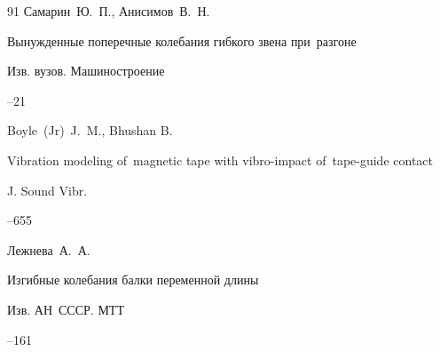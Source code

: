 \begin{thebibliography}{91}
\by Самарин~Ю.~П., Анисимов~В.~Н.

\paper Вынужденные поперечные колебания гибкого звена при~разгоне

\jour Изв. вузов. Машиностроение



--21











\by Boyle~(Jr)~J.~M., Bhushan B.

\paper Vibration modeling of~magnetic tape with vibro-impact of~tape-guide contact

\jour J. Sound Vibr.




--655













\by Лежнева~А.~А.

\paper Изгибные колебания балки переменной длины

\jour Изв. АН~СССР. МТТ



--161








\end{thebibliography}

